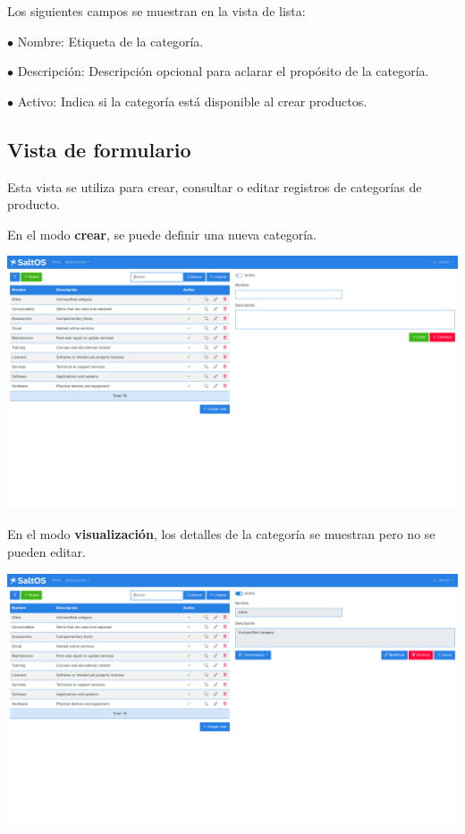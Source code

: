 \documentclass[a4paper]{article}
\begin{document}
Los siguientes campos se muestran en la vista de lista:

\begin{compactitem}
\item[\color{myblue}$\bullet$] Nombre: Etiqueta de la categoría.
\item[\color{myblue}$\bullet$] Descripción: Descripción opcional para aclarar el propósito de la categoría.
\item[\color{myblue}$\bullet$] Activo: Indica si la categoría está disponible al crear productos.
\end{compactitem}

\hypertarget{toc159}{}
\subsection{Vista de formulario}

Esta vista se utiliza para crear, consultar o editar registros de categorías de producto.

En el modo \textbf{crear}, se puede definir una nueva categoría.

\begin{center}\includegraphics[width=1\textwidth]{../ujest/snaps/test-screenshots-js-screenshots-sales-products-categories-create-es-es-1-snap.png}\end{center}

En el modo \textbf{visualización}, los detalles de la categoría se muestran pero no se pueden editar.

\begin{center}\includegraphics[width=1\textwidth]{../ujest/snaps/test-screenshots-js-screenshots-sales-products-categories-view-10-es-es-1-snap.png}\end{center}
\end{document}
